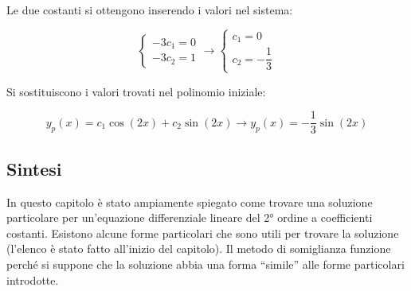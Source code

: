 \documentclass[a4paper]{article}
\newcommand{\dquotes}[1]{``#1''}
\begin{document}
	\noindent
	Le due costanti si ottengono inserendo i valori nel sistema:
	
	\begin{equation*}
		\begin{cases}
			-3c_{1} = 0 \\
			-3c_{2} = 1
		\end{cases}
		\longrightarrow
		\begin{cases}
			c_{1} = 0 \\
			c_{2} = -\dfrac{1}{3}
		\end{cases}
	\end{equation*}

	\noindent
	Si sostituiscono i valori trovati nel polinomio iniziale:
	
	\begin{equation*}
		y_{p}\left(x\right) = c_{1}\cos\left(2x\right) + c_{2}\sin\left(2x\right) \longrightarrow y_{p}\left(x\right) = -\dfrac{1}{3}\sin\left(2x\right)
	\end{equation*}

	\noindent{}

	\newpage
	
	\subsection{Sintesi}
	
	In questo capitolo è stato ampiamente spiegato come trovare una soluzione particolare per un'equazione differenziale lineare del 2° ordine a coefficienti costanti. Esistono alcune forme particolari che sono utili per trovare la soluzione (l'elenco è stato fatto all'inizio del capitolo). Il metodo di somiglianza funzione perché si suppone che la soluzione abbia una forma \dquotes{simile} alle forme particolari introdotte.
	
\end{document}
